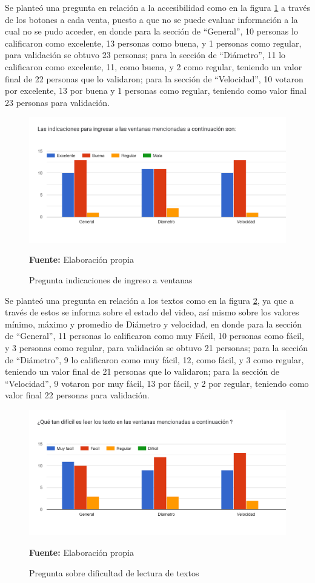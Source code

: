 \documentclass[12pt,twocolumn,a4paper]{article}
\begin{document}
Se planteó una pregunta en relación a la accesibilidad como en la figura \ref{Encuesta6} a través de los botones a cada venta, puesto a que no se puede evaluar información a la cual no se pudo acceder, en donde para la sección de “General”, 10 personas lo calificaron como excelente, 13 personas como buena, y 1 personas como regular, para validación se obtuvo 23 personas; para la sección de “Diámetro”, 11 lo calificaron como excelente, 11, como  buena, y 2 como regular, teniendo un valor final de 22 personas que lo validaron; para la sección de “Velocidad”, 10 votaron por excelente, 13 por  buena y 1 personas como regular, teniendo como valor final 23 personas para validación.

\begin{figure}
	\centering
	\includegraphics[scale=0.2]{Encuesta6.png}
	\caption{Pregunta indicaciones de ingreso a ventanas} \textbf{Fuente:} Elaboración propia
	\label{Encuesta6}
\end{figure}

Se planteó una pregunta en relación a los textos como en la figura \ref{Encuesta7}, ya que a través de estos se informa sobre el estado del video, así mismo sobre los valores mínimo, máximo y promedio de Diámetro y velocidad, en donde para la sección de “General”, 11 personas lo calificaron como muy Fácil, 10 personas como fácil, y 3 personas como regular, para validación se obtuvo 21 personas; para la sección de “Diámetro”, 9 lo calificaron como muy fácil, 12, como fácil, y 3 como regular, teniendo un valor final de 21 personas que lo validaron; para la sección de “Velocidad”, 9 votaron por muy fácil, 13 por fácil, y 2 por regular, teniendo como valor final 22 personas para validación. 

\begin{figure}
	\centering
	\includegraphics[scale=0.2]{Encuesta7.png}
	\caption{Pregunta sobre dificultad de lectura de textos} \textbf{Fuente:} Elaboración propia
	\label{Encuesta7}
\end{figure} 
\end{document}
